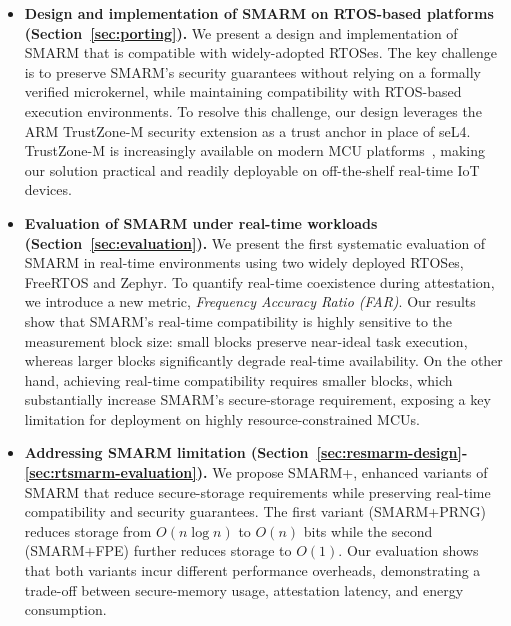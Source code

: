 \documentclass{ieeeaccess}
\newcommand{\rtsmarmone}{SMARM+PRNG\xspace}
\newcommand{\rtsmarmtwo}{SMARM+FPE\xspace}
\newcommand{\acron}{SMARM+\xspace}
\begin{document}
\begin{itemize}\sloppy
    \item \textbf{Design and implementation of SMARM on RTOS-based platforms (Section~\ref{sec:porting}).}
    We present a design and implementation of SMARM that is compatible with widely-adopted RTOSes.
    The key challenge is to preserve SMARM's security guarantees without relying on a formally verified microkernel, while maintaining compatibility with RTOS-based execution environments.
    To resolve this challenge, our design leverages the ARM TrustZone-M security extension as a trust anchor in place of seL4.
    TrustZone-M is increasingly available on modern MCU platforms~\cite{armCommunity}, making our solution practical and readily deployable on off-the-shelf real-time IoT devices.
    
    \item \textbf{Evaluation of SMARM under real-time workloads (Section~\ref{sec:evaluation}).}
    We present the first systematic evaluation of SMARM in real-time environments using two widely deployed RTOSes, FreeRTOS and Zephyr.
    To quantify real-time coexistence during attestation, we introduce a new metric, \emph{Frequency Accuracy Ratio (FAR)}.
    Our results show that SMARM's real-time compatibility is highly sensitive to the measurement block size: small blocks preserve near-ideal task execution, whereas larger blocks significantly degrade real-time availability.
    On the other hand, achieving real-time compatibility requires smaller blocks, which substantially increase SMARM's secure-storage requirement, exposing a key limitation for deployment on highly resource-constrained MCUs.
 
    \item \textbf{Addressing SMARM limitation (Section~\ref{sec:resmarm-design}-\ref{sec:rtsmarm-evaluation}).}
    We propose \acron, enhanced variants of SMARM that reduce secure-storage requirements while preserving real-time compatibility and security guarantees.
    The first variant (\rtsmarmone) reduces storage from $O(n \log n)$ to $O(n)$ bits while the second (\rtsmarmtwo) further reduces storage to $O(1)$.
    Our evaluation shows that both variants incur different performance overheads, demonstrating a trade-off between secure-memory usage, attestation latency, and energy consumption. 

\end{itemize}
\end{document}
